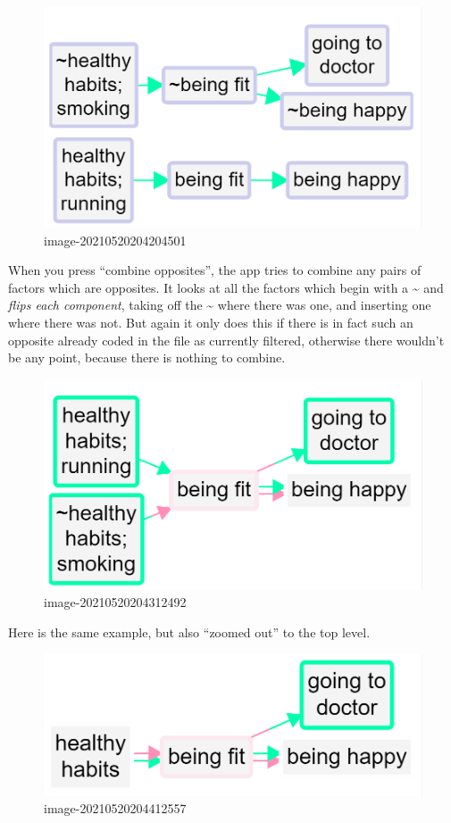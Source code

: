 \documentclass[
]{book}
\begin{document}
\begin{figure}
\centering
\includegraphics{_assets/image-20210520204204501.png}
\caption{image-20210520204204501}
\end{figure}

When you press ``combine opposites'', the app tries to combine any pairs of factors which are opposites. It looks at all the factors which begin with a \textasciitilde{} and \emph{flips each component}, taking off the \textasciitilde{} where there was one, and inserting one where there was not. But again it only does this if there is in fact such an opposite already coded in the file as currently filtered, otherwise there wouldn't be any point, because there is nothing to combine.

\begin{figure}
\centering
\includegraphics{_assets/image-20210520204312492.png}
\caption{image-20210520204312492}
\end{figure}

Here is the same example, but also ``zoomed out'' to the top level.

\begin{figure}
\centering
\includegraphics{_assets/image-20210520204412557.png}
\caption{image-20210520204412557}
\end{figure}
\end{document}
